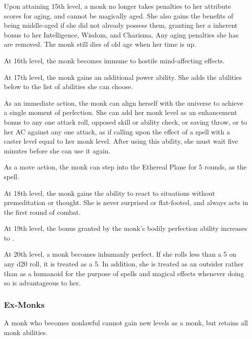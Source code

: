  Upon attaining 15th level, a monk no longer takes penalties to her attribute scores for aging, and cannot be magically aged. She also gains the benefits of being middle-aged if she did not already possess them, granting her a  inherent bonus to her Intelligence, Wisdom, and Charisma. Any aging penalties she has are removed. The monk still dies of old age when her time is up.

 At 16th level, the monk becomes immune to hostile mind-affecting effects.

 At 17th level, the monk gains an additional \ki power ability. She adds the abilities below to the list of abilities she can choose.

 As an immediate action, the monk can align herself with the universe to achieve a single moment of perfection. She can add her monk level as an enhancement bonus to any one attack roll, opposed skill or ability check, or saving throw, or to her AC against any one attack, as if calling upon the effect of a  spell with a caster level equal to her monk level. After using this ability, she must wait five minutes before she can use it again.

 As a move action, the monk can step into the Ethereal Plane for 5 rounds, as the  spell.

 At 18th level, the monk gains the ability to react to situations without premeditation or thought. She is never surprised or flat-footed, and always acts in the first round of combat.

 At 19th level, the bonus granted by the monk's bodily perfection ability increases to .

 At 20th level, a monk becomes inhumanly perfect. If she rolls less than a 5 on any d20 roll, it is treated as a 5. In addition, she is treated as an outsider rather than as a humanoid for the purpose of spells and magical effects whenever doing so is advantageous to her.

\subsubsection{Ex-Monks}
A monk who becomes nonlawful cannot gain new levels as a monk, but retains all monk abilities.

